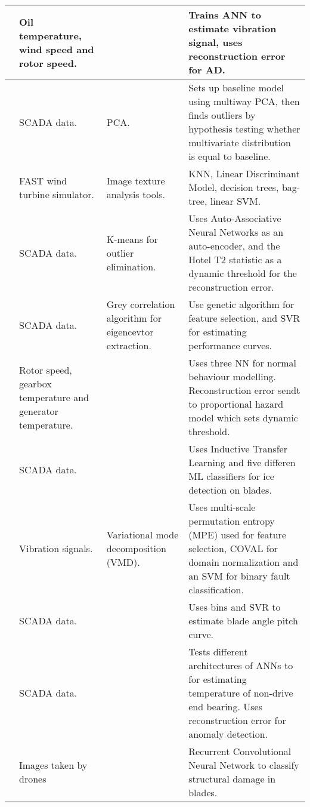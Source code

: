 \begin{longtable}{p{}p{}p{}p{}}
    \cite{ANN_damage_detection_gearbox_wt} & Oil temperature, wind speed and rotor speed. & & Trains ANN to estimate vibration signal, uses reconstruction error for AD. \\ \hline
    \cite{multiway_PCA_multivar_inference_cm_wt} & SCADA data. & PCA. & Sets up baseline model using multiway PCA, then finds outliers by hypothesis testing whether multivariate distribution is equal to baseline. \\ \hline
    \cite{image_texture_analysis_FD_wt} & FAST wind turbine simulator. & Image texture analysis tools. & KNN, Linear Discriminant Model, decision trees, bag-tree, linear SVM.\\ \hline
    \cite{auto_associative_nn_wt_fault_detection} & SCADA data. & K-means for outlier elimination. & Uses Auto-Associative Neural Networks as an auto-encoder, and the Hotel T2 statistic as a dynamic threshold for the reconstruction error.\\ \hline
    \cite{abnormal_detection_scada_data_mining} & SCADA data. & Grey correlation algorithm for eigencevtor extraction. & Use genetic algorithm for feature selection, and SVR for estimating performance curves. \\ \hline
    \cite{health_cond_model_nn_proportional_hazard_models} & Rotor speed, gearbox temperature and generator temperature. & & Uses three NN for normal behaviour modelling. Reconstruction error sendt to proportional hazard model which sets dynamic threshold. \\ \hline
    \cite{ice_detection_using_ITL} & SCADA data. & & Uses Inductive Transfer Learning and five differen ML classifiers for ice detection on blades. \\ \hline
    \cite{VMD_MPE_COVAL_fault_detection_gearbox} & Vibration signals. & Variational mode decomposition (VMD). & Uses multi-scale permutation entropy (MPE) used for feature selection, COVAL for domain normalization and an SVM for binary fault classification.\\ \hline
    \cite{SVR_blade_pitch_curve_cm} & SCADA data. & & Uses bins and SVR to estimate blade angle pitch curve. \\ \hline
    \cite{detecting_malfunctions_wt_generator_bearings_generic_vs_specific_models} & SCADA data. &  & Tests different architectures of ANNs to for estimating temperature of non-drive end bearing. Uses reconstruction error for anomaly detection. \\ \hline
    \cite{image_based_surface_damage_detection_DL_drone_inspection} & Images taken by drones & & Recurrent Convolutional Neural Network to classify structural damage in blades.\\ \hline

\end{longtable}
